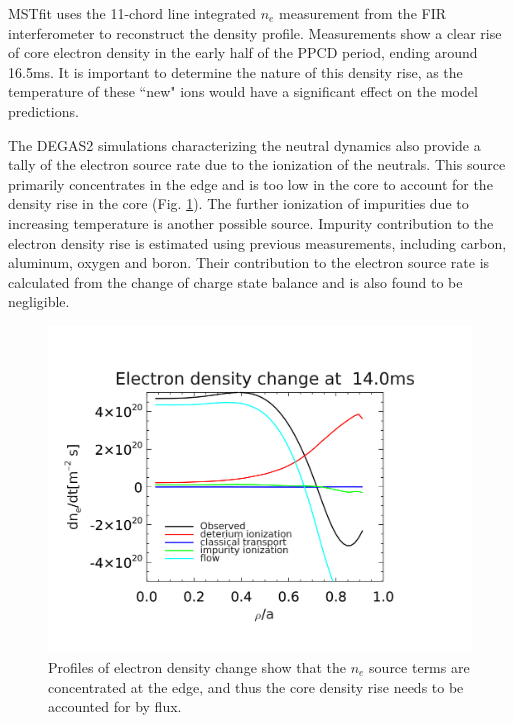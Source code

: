 \documentclass[aip, pop, preprint]{revtex4-1}
\begin{document}
MSTfit uses the 11-chord line integrated $n_e$ measurement from the FIR
interferometer to reconstruct the density profile. Measurements show a clear rise of
core electron density in the early half of the PPCD period, ending around 16.5ms. It is
important to determine the nature of this density rise, as the temperature of
these ``new" ions would have a significant effect on the model predictions.

The DEGAS2 simulations characterizing the neutral dynamics also provide a
tally of the electron source rate due to the ionization of the neutrals. This
source primarily concentrates in the edge and is too low in the core to account
for the density rise in the core (Fig. \ref{fig:ne_change}). The further
ionization of impurities due to increasing temperature is another possible
source. Impurity contribution to the electron density rise is estimated using
previous measurements, including carbon, aluminum, oxygen and boron\cite{Kumar2012a, Nornberg2018IncorporatingCharge}. Their contribution to the electron source
rate is calculated from the change of charge state balance and is also found to be negligible.


\begin{figure}
	\centering
	\includegraphics[width=0.95\linewidth]{./plots/dndt_at14-1}	
	\caption{Profiles of electron density change show that the $n_e$ source terms are concentrated at the edge, and thus the core density rise needs to be accounted for by flux.}
	\label{fig:ne_change}
\end{figure}
\end{document}
